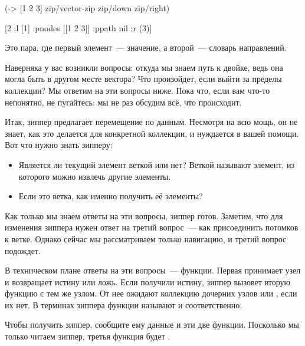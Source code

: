 \begin{english}
  \begin{clojure}
(-> [1 2 3]
    zip/vector-zip
    zip/down
    zip/right)

[2 {:l [1]
    :pnodes [[1 2 3]]
    :ppath nil
    :r (3)}]
  \end{clojure}
\end{english}

Это пара, где первый элемент~--- значение, а второй~--- словарь направлений.

Наверняка у вас возникли вопросы: откуда мы знаем путь к двойке, ведь она могла
быть в другом месте вектора? Что произойдет, если выйти за пределы коллекции?
Мы ответим на эти вопросы ниже. Пока что, если вам что-то непонятно, не
пугайтесь: мы не раз обсудим всё, что происходит.

Итак, зиппер предлагает перемещение по данным. Несмотря на всю мощь, он не
знает, как это делается для конкретной коллекции, и нуждается в вашей
помощи. Вот что нужно знать зипперу:

\begin{itemize}

\item
  Является ли текущий элемент веткой или нет? Веткой называют элемент, из
  которого можно извлечь другие элементы.

\item
  Если это ветка, как именно получить её элементы?

\end{itemize}

\pagebreaklarge

Как только мы знаем ответы на эти вопросы, зиппер готов. Заметим, что для
изменения зиппера нужен ответ на третий вопрос~--- как присоединить потомков к
ветке. Однако сейчас мы рассматриваем только навигацию, и третий вопрос
подождет.


В техническом плане ответы на эти вопросы~--- функции. Первая принимает узел и
возвращает истину или ложь. Если получили истину, зиппер вызовет вторую функцию
с тем же узлом. От нее ожидают коллекцию дочерних узлов или , если их
нет. В терминах зиппера функции называют  и 
соответственно.

Чтобы получить зиппер, сообщите ему данные и эти две функции. Посколько мы
только читаем зиппер, третья функция будет .

\def\urlclojurezip{https://github.com/clojure/clojure/blob/master/src/clj/clojure/zip.clj}

